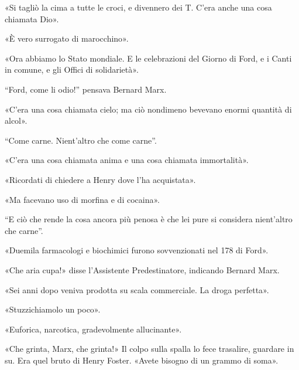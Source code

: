 \documentclass[
a5paper, %
10pt, %
twoside, 
onecolumn, %
openany, %
]{memoir}
\renewenvironment{shaded}{%
  \def\FrameCommand{\fboxsep=\FrameSep \colorbox{shadecolor}}%
  \MakeFramed{\advance\hsize-\width \FrameRestore\FrameRestore}}%
 {\endMakeFramed}
\begin{document}
«Si tagliò la cima a tutte le croci, e divennero dei T. C’era anche una cosa chiamata Dio».

\begin{shaded}
    «È vero surrogato di marocchino».
\end{shaded}

«Ora abbiamo lo Stato mondiale. E le celebrazioni del Giorno di Ford, e i Canti in comune, e gli Offici di solidarietà».

\begin{shaded}
    “Ford, come li odio!” pensava Bernard Marx.
\end{shaded}

«C’era una cosa chiamata cielo; ma ciò nondimeno bevevano enormi quantità di alcol».

\begin{shaded}
    “Come carne. Nient’altro che come carne”.
\end{shaded}

«C’era una cosa chiamata anima e una cosa chiamata immortalità».

\begin{shaded}
    «Ricordati di chiedere a Henry dove l’ha acquistata».
\end{shaded}

«Ma facevano uso di morfina e di cocaina».

\begin{shaded}
    “E ciò che rende la cosa ancora più penosa è che lei pure si considera nient’altro che carne”.
\end{shaded}

«Duemila farmacologi e biochimici furono sovvenzionati nel 178 di Ford».

\begin{shaded}
    «Che aria cupa!» disse l’Assistente Predestinatore, indicando Bernard Marx.
\end{shaded}

«Sei anni dopo veniva prodotta su scala commerciale. La droga perfetta».

\begin{shaded}
    «Stuzzichiamolo un poco».
\end{shaded}

«Euforica, narcotica, gradevolmente allucinante».

\begin{shaded}
    «Che grinta, Marx, che grinta!» Il colpo sulla spalla lo fece trasalire, guardare in su. Era quel bruto di Henry Foster. «Avete bisogno di un grammo di soma».
\end{shaded}
\end{document}
